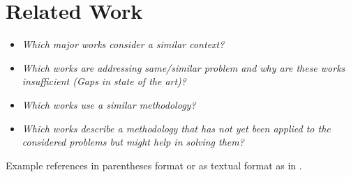 \section{Related Work}
\label{sec:Related Work}

\begin{itemize}
	\item \emph{Which major works consider a similar context?}
	\item \emph{Which works are addressing same/similar problem and why are these works insufficient (Gaps in state of the art)?}
	\item \emph{Which works use a similar methodology?}
    \item \emph{Which works describe a methodology that has not yet been applied to the considered problems but might help in solving them?}
\end{itemize}

Example references in parentheses format \citep{Raibert1986LeggedRobotsThatBalance, Vukobratovic2004ZeroMomentPoint} or as textual format as in \citet{Pratt1995SEA}.
